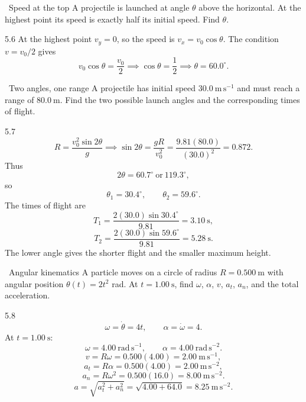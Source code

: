 \begin{exercise}{\core\ Speed at the top}
A projectile is launched at angle $\theta$ above the horizontal. At the highest
point its speed is exactly half its initial speed. Find $\theta$.
\end{exercise}

\begin{tabletworkspace}[6.5cm]
\end{tabletworkspace}

\begin{solution}{5.6}
At the highest point $v_y=0$, so the speed is $v_x=v_0\cos\theta$. The condition
$v=v_0/2$ gives
\[
v_0\cos\theta=\frac{v_0}{2}
\implies
\cos\theta=\frac12
\implies
\theta=60.0^\circ.
\]
\end{solution}

\begin{exercise}{\core\ Two angles, one range}
A projectile has initial speed $30.0\ \mathrm{m\,s^{-1}}$ and must reach a range
of $80.0\ \mathrm{m}$. Find the two possible launch angles and the corresponding
times of flight.
\end{exercise}

\begin{tabletworkspace}[6.5cm]
\end{tabletworkspace}

\begin{solution}{5.7}
\[
R=\frac{v_0^2\sin2\theta}{g}
\implies
\sin2\theta=\frac{gR}{v_0^2}
=\frac{9.81(80.0)}{(30.0)^2}=0.872.
\]
Thus
\[
2\theta=60.7^\circ\ \text{or}\ 119.3^\circ,
\]
so
\[
\theta_1=30.4^\circ,\qquad \theta_2=59.6^\circ.
\]
The times of flight are
\[
T_1=\frac{2(30.0)\sin30.4^\circ}{9.81}=3.10\ \mathrm{s},
\]
\[
T_2=\frac{2(30.0)\sin59.6^\circ}{9.81}=5.28\ \mathrm{s}.
\]
The lower angle gives the shorter flight and the smaller maximum height.
\end{solution}

\begin{exercise}{\core\ Angular kinematics}
A particle moves on a circle of radius $R=0.500\ \mathrm{m}$ with angular
position $\theta(t)=2t^2$ rad. At $t=1.00\ \mathrm{s}$, find $\omega$, $\alpha$,
$v$, $a_t$, $a_n$, and the total acceleration.
\end{exercise}

\begin{tabletworkspace}[6.5cm]
\end{tabletworkspace}

\begin{solution}{5.8}
\[
\omega=\dot\theta=4t,\qquad \alpha=\dot\omega=4.
\]
At $t=1.00\ \mathrm{s}$:
\[
\omega=4.00\ \mathrm{rad\,s^{-1}},\qquad
\alpha=4.00\ \mathrm{rad\,s^{-2}}.
\]
\[
v=R\omega=0.500(4.00)=2.00\ \mathrm{m\,s^{-1}},
\]
\[
a_t=R\alpha=0.500(4.00)=2.00\ \mathrm{m\,s^{-2}},
\]
\[
a_n=R\omega^2=0.500(16.0)=8.00\ \mathrm{m\,s^{-2}}.
\]
\[
a=\sqrt{a_t^2+a_n^2}=\sqrt{4.00+64.0}=8.25\ \mathrm{m\,s^{-2}}.
\]
\end{solution}

